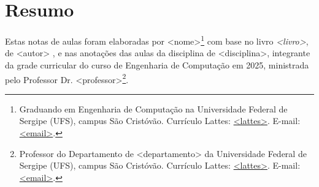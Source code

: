 \chapter*{Resumo}

\begin{onehalfspace} %
	Estas notas de aulas foram elaboradas por <nome>\footnote{Graduando em Engenharia de Computação na Universidade Federal de Sergipe (UFS), campus São Cristóvão. Currículo Lattes: \url{<lattes>}. E-mail: \href{mailto:<email>}{<email>}.} com base no livro \textit{<livro>}, de <autor> \cite{autorGenerico}, e nas anotações das aulas da disciplina de <disciplina>, integrante da grade curricular do curso de Engenharia de Computação em 2025, ministrada pelo Professor Dr. <professor>\footnote{Professor do Departamento de <departamento> da Universidade Federal de Sergipe (UFS), campus São Cristóvão. Currículo Lattes: \url{<lattes>}. E-mail: \href{mailto:<email>}{<email>}.}.
\end{onehalfspace}

